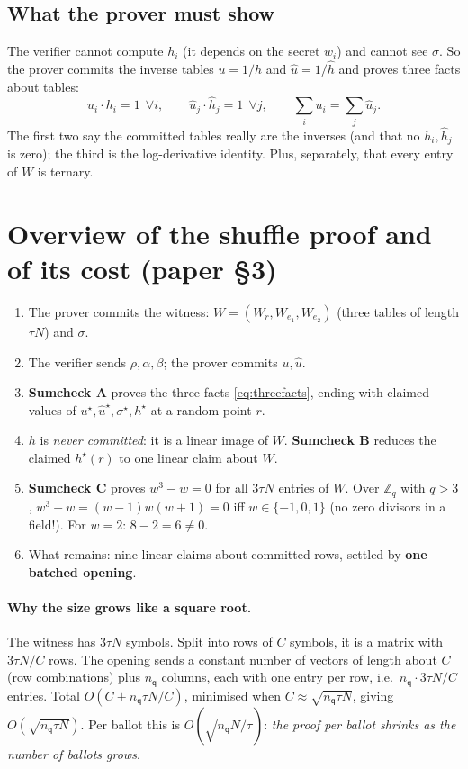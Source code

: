 \documentclass[11pt,a4paper]{article}
\newcommand{\Zq}{\mathbb{Z}_q}
\newcommand{\msk}[1]{#1^{\star}}
\newcommand{\nq}{n_{\mathsf{q}}}
\newcommand{\uh}{\hat{u}}
\newcommand{\hh}{\hat{h}}
\theoremstyle{definition}
\theoremstyle{plain}
\begin{document}
\subsection{What the prover must show}

The verifier cannot compute $h_i$ (it depends on the secret $w_i$) and cannot see $\sigma$. So the prover
commits the inverse tables $u=1/h$ and $\uh=1/\hh$ and proves three facts about tables:
\begin{equation}\label{eq:threefacts}
  u_i\cdot h_i=1\ \ \forall i,\qquad \uh_j\cdot\hh_j=1\ \ \forall j,\qquad \sum_iu_i=\sum_j\uh_j .
\end{equation}
The first two say the committed tables really are the inverses (and that no $h_i,\hh_j$ is zero);
the third is the log-derivative identity. Plus, separately, that every entry of $W$ is ternary.

\section{Overview of the shuffle proof and of its cost (paper \S3)}
\label{sec:overviewproof}

\begin{enumerate}[leftmargin=1.5em]
\item The prover commits the witness: $W=(W_r,W_{e_1},W_{e_2})$ (three tables of length $\tau N$)
  and $\sigma$.
\item The verifier sends $\rho,\alpha,\beta$; the prover commits $u,\uh$.
\item \textbf{Sumcheck A} proves the three facts \eqref{eq:threefacts}, ending with claimed values of
  $\msk u,\msk\uh,\msk\sigma,\msk h$ at a random point $r$.
\item $h$ is \emph{never committed}: it is a linear image of $W$. \textbf{Sumcheck B} reduces the
  claimed $\msk h(r)$ to one linear claim about $W$.
\item \textbf{Sumcheck C} proves $w^3-w=0$ for all $3\tau N$ entries of $W$. Over $\Zq$ with $q>3$,
  $w^3-w=(w-1)w(w+1)=0$ iff $w\in\{-1,0,1\}$ (no zero divisors in a field!). For $w=2$: $8-2=6\neq 0$.
\item What remains: nine linear claims about committed rows, settled by \textbf{one batched opening}.
\end{enumerate}

\paragraph{Why the size grows like a square root.} The witness has $3\tau N$ symbols. Split into rows of
$C$ symbols, it is a matrix with $3\tau N/C$ rows. The opening sends a constant number of vectors of
length about $C$ (row combinations) plus $\nq$ columns, each with one entry per row, i.e.\ $\nq\cdot
3\tau N/C$ entries. Total $O(C+\nq\tau N/C)$, minimised when $C\approx\sqrt{\nq\tau N}$, giving
$O(\sqrt{\nq\tau N})$. Per ballot this is $O(\sqrt{\nq N/\tau})$: \emph{the proof per ballot shrinks as
the number of ballots grows}.
\end{document}
